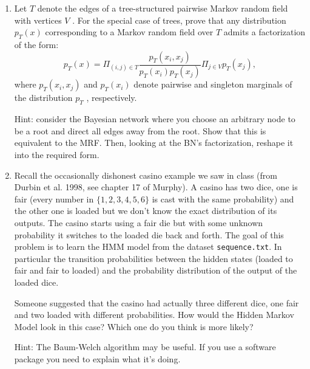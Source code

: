 \documentclass[11pt]{article}
\begin{document}
\begin{enumerate}
\item Let $T$ denote the edges of a tree-structured pairwise Markov random field with vertices $V$ . For the special case of trees, prove that any distribution $p_T(x)$ corresponding to a Markov random field over $T$ admits a factorization of the form:
$$p_T(x)=\Pi_{(i,j)\in T} \frac{p_T(x_i,x_j)}{p_T(x_i)p_T(x_j)} \Pi_{j\in V} p_T(x_j), $$
where $p_T(x_i,x_j)$ and $p_T(x_i)$ denote pairwise and singleton marginals of the distribution $p_T$ , respectively.

Hint: consider the Bayesian network where you choose an arbitrary node to be a root and direct all edges away from the root. Show that this is equivalent to the MRF. Then, looking at the BN’s factorization, reshape it into the required form.

\item Recall the occasionally dishonest casino example we saw in class (from Durbin et al. 1998, see chapter 17 of Murphy). A casino has two dice, one is fair (every number in $\{1,2,3,4,5,6\}$ is cast with the same probability) and the other one is loaded but we don't know the exact distribution of its outputs. The casino starts using a fair die but with some unknown probability it switches to the loaded die back and forth. The goal of this problem is to learn the HMM model from the dataset \texttt{sequence.txt}. In particular the transition probabilities between the hidden states (loaded to fair and fair to loaded) and the probability distribution of the output of the loaded dice.  

Someone suggested that the casino had actually three different dice, one fair and two loaded with different probabilities. How would the Hidden Markov Model look in this case? Which one do you think is more likely?

Hint: The Baum-Welch algorithm may be useful. If you use a software package you need to explain what it's doing.

\end{enumerate}
\end{document}
